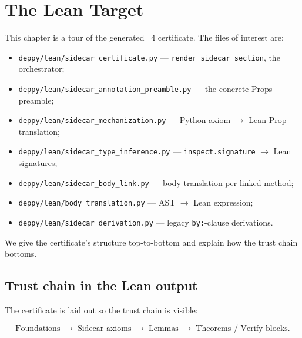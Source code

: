 \chapter{The Lean Target}
\label{ch:lean}

This chapter is a tour of the generated \Lean{}~4 certificate.  The
files of interest are:

\begin{itemize}[leftmargin=1.7em]
  \item \texttt{deppy/lean/sidecar\_certificate.py} ---
    \texttt{render\_sidecar\_section}, the orchestrator;
  \item \texttt{deppy/lean/sidecar\_annotation\_preamble.py} ---
    the concrete-Props preamble;
  \item \texttt{deppy/lean/sidecar\_mechanization.py} ---
    Python-axiom $\to$ Lean-Prop translation;
  \item \texttt{deppy/lean/sidecar\_type\_inference.py} ---
    \texttt{inspect.signature} $\to$ Lean signatures;
  \item \texttt{deppy/lean/sidecar\_body\_link.py} ---
    body translation per linked method;
  \item \texttt{deppy/lean/body\_translation.py} ---
    AST $\to$ Lean expression;
  \item \texttt{deppy/lean/sidecar\_derivation.py} ---
    legacy \texttt{by:}-clause derivations.
\end{itemize}

We give the certificate's structure top-to-bottom and explain how the
trust chain bottoms.

\section{Trust chain in the Lean output}
\label{sec:trust-chain}

The certificate is laid out so the trust chain is visible:

\begin{equation*}
  \boxed{\text{Foundations}} \;\longrightarrow\; \boxed{\text{Sidecar axioms}} \;\longrightarrow\; \boxed{\text{Lemmas}} \;\longrightarrow\; \boxed{\text{Theorems / Verify blocks}}.
\end{equation*}

